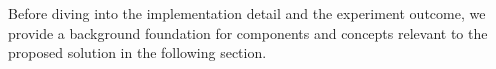 Before diving into the implementation detail and the experiment outcome, we provide a background foundation for components and concepts relevant to the proposed solution in the following section. 















